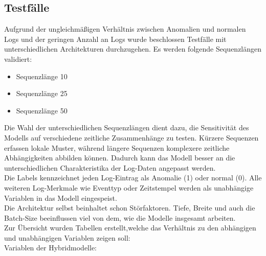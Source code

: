 \documentclass[a4paper,12pt]{article}
\begin{document}
	\subsection{Testfälle}
	Aufgrund der ungleichmäßigen Verhältnis zwischen Anomalien und normalen Logs und der geringen Anzahl an Logs wurde beschlossen Testfälle mit unterschiedlichen Architekturen durchzugehen.
	Es werden folgende Sequenzlängen validiert:
	\begin{itemize}
		\item Sequenzlänge 10
		\item Sequenzlänge 25
		\item Sequenzlänge 50
	\end{itemize}
	Die Wahl der unterschiedlichen Sequenzlängen dient dazu, die Sensitivität des Modells auf verschiedene zeitliche Zusammenhänge zu testen. Kürzere Sequenzen erfassen lokale Muster, während längere Sequenzen komplexere zeitliche Abhängigkeiten abbilden können. Dadurch kann das Modell besser an die unterschiedlichen Charakteristika der Log-Daten angepasst werden.
	\\[0.5em]
	Die Labels kennzeichnet jeden Log-Eintrag als Anomalie (1) oder normal (0). Alle weiteren Log-Merkmale wie Eventtyp oder Zeitstempel werden als unabhängige Variablen in das Modell eingespeist.
	\\[0.5em]
	Die Architektur selbst beinhaltet schon Störfaktoren. Tiefe, Breite und auch die Batch-Size beeinflussen viel von dem, wie die Modelle insgesamt arbeiten.
	\\[0.5em]
	Zur Übersicht wurden Tabellen erstellt,welche das Verhältnis zu den abhängigen und unabhängigen Variablen zeigen soll:
	\\[0.5em]
	Variablen der Hybridmodelle:
	
\end{document}
